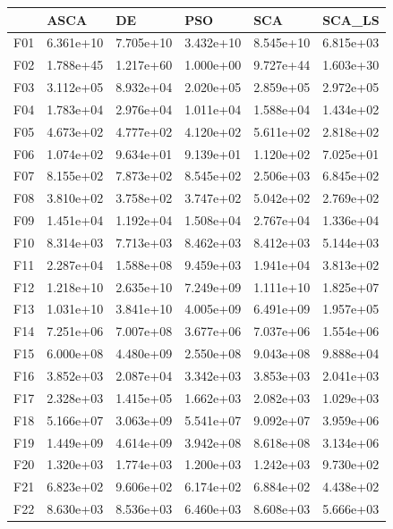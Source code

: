 \begin{tabular}{llllll}
\toprule
{} &       ASCA &         DE &        PSO &        SCA &     SCA\_LS \\
\midrule
F01  &  6.361e+10 &  7.705e+10 &  3.432e+10 &  8.545e+10 &  6.815e+03 \\
F02  &  1.788e+45 &  1.217e+60 &  1.000e+00 &  9.727e+44 &  1.603e+30 \\
F03  &  3.112e+05 &  8.932e+04 &  2.020e+05 &  2.859e+05 &  2.972e+05 \\
F04  &  1.783e+04 &  2.976e+04 &  1.011e+04 &  1.588e+04 &  1.434e+02 \\
F05  &  4.673e+02 &  4.777e+02 &  4.120e+02 &  5.611e+02 &  2.818e+02 \\
F06  &  1.074e+02 &  9.634e+01 &  9.139e+01 &  1.120e+02 &  7.025e+01 \\
F07  &  8.155e+02 &  7.873e+02 &  8.545e+02 &  2.506e+03 &  6.845e+02 \\
F08  &  3.810e+02 &  3.758e+02 &  3.747e+02 &  5.042e+02 &  2.769e+02 \\
F09  &  1.451e+04 &  1.192e+04 &  1.508e+04 &  2.767e+04 &  1.336e+04 \\
F10  &  8.314e+03 &  7.713e+03 &  8.462e+03 &  8.412e+03 &  5.144e+03 \\
F11  &  2.287e+04 &  1.588e+08 &  9.459e+03 &  1.941e+04 &  3.813e+02 \\
F12  &  1.218e+10 &  2.635e+10 &  7.249e+09 &  1.111e+10 &  1.825e+07 \\
F13  &  1.031e+10 &  3.841e+10 &  4.005e+09 &  6.491e+09 &  1.957e+05 \\
F14  &  7.251e+06 &  7.007e+08 &  3.677e+06 &  7.037e+06 &  1.554e+06 \\
F15  &  6.000e+08 &  4.480e+09 &  2.550e+08 &  9.043e+08 &  9.888e+04 \\
F16  &  3.852e+03 &  2.087e+04 &  3.342e+03 &  3.853e+03 &  2.041e+03 \\
F17  &  2.328e+03 &  1.415e+05 &  1.662e+03 &  2.082e+03 &  1.029e+03 \\
F18  &  5.166e+07 &  3.063e+09 &  5.541e+07 &  9.092e+07 &  3.959e+06 \\
F19  &  1.449e+09 &  4.614e+09 &  3.942e+08 &  8.618e+08 &  3.134e+06 \\
F20  &  1.320e+03 &  1.774e+03 &  1.200e+03 &  1.242e+03 &  9.730e+02 \\
F21  &  6.823e+02 &  9.606e+02 &  6.174e+02 &  6.884e+02 &  4.438e+02 \\
F22  &  8.630e+03 &  8.536e+03 &  6.460e+03 &  8.608e+03 &  5.666e+03 \\

\end{tabular}

